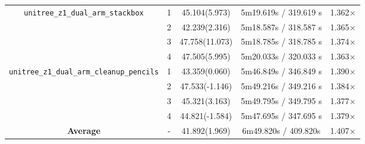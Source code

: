 \begin{table}[htbp]
\begin{tabular}{|c|c|c|c|c|}
        \multirow{4}{*}{\texttt{unitree\_z1\_dual\_arm\_stackbox}} 
        & 1 & 45.104(5.973)  & 5m19.619s / 319.619 s & 1.362$\times$ \\ \cline{2-5}
        & 2 & 42.239(2.316)  & 5m18.587s / 318.587 s & 1.365$\times$ \\ \cline{2-5}
        & 3 & 47.758(11.073) & 5m18.785s / 318.785 s & 1.374$\times$ \\ \cline{2-5}
        & 4 & 47.505(5.995)  & 5m20.033s / 320.033 s & 1.363$\times$ \\ \hline
        
        \multirow{4}{*}{\texttt{unitree\_z1\_dual\_arm\_cleanup\_pencils}} 
        & 1 & 43.359(0.060)  & 5m46.849s / 346.849 s & 1.390$\times$ \\ \cline{2-5}
        & 2 & 47.533(-1.146) & 5m49.216s / 349.216 s & 1.384$\times$ \\ \cline{2-5}
        & 3 & 45.321(3.163)  & 5m49.795s / 349.795 s & 1.377$\times$ \\ \cline{2-5}
        & 4 & 44.821(-1.584) & 5m47.695s / 347.695 s & 1.379$\times$\\ \hline
        
        \textbf{Average} & - & 41.892(1.969) & 6m49.820s / 409.820s & 1.407$\times$ \\ \hline
    \end{tabular}
    \label{tab:test_results}
\end{table}







